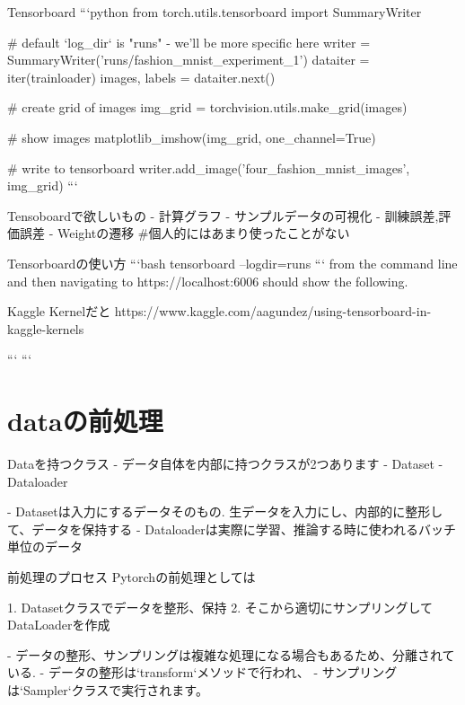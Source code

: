 \begin{frame}[fragile]{}Tensorboard
```python
from torch.utils.tensorboard import SummaryWriter

# default `log_dir` is "runs" - we'll be more specific here
writer = SummaryWriter('runs/fashion_mnist_experiment_1')
dataiter = iter(trainloader)
images, labels = dataiter.next()

# create grid of images
img_grid = torchvision.utils.make_grid(images)

# show images
matplotlib_imshow(img_grid, one_channel=True)

# write to tensorboard
writer.add_image('four_fashion_mnist_images', img_grid)
```

\end{frame}
\begin{frame}[fragile]{}Tensoboardで欲しいもの
- 計算グラフ
- サンプルデータの可視化
- 訓練誤差,評価誤差
- Weightの遷移 #個人的にはあまり使ったことがない

\end{frame}
\begin{frame}[fragile]{}Tensorboardの使い方
```bash
tensorboard --logdir=runs
```
from the command line and then navigating to https://localhost:6006 should show the following.

\end{frame}
\begin{frame}[fragile]{Kaggle Kernelだと}
https://www.kaggle.com/aagundez/using-tensorboard-in-kaggle-kernels

```
```


\section{dataの前処理}

\end{frame}
\begin{frame}[fragile]{}Dataを持つクラス
- データ自体を内部に持つクラスが2つあります
  - Dataset
  - Dataloader

- Datasetは入力にするデータそのもの.
  生データを入力にし、内部的に整形して、データを保持する
- Dataloaderは実際に学習、推論する時に使われるバッチ単位のデータ

\end{frame}
\begin{frame}[fragile]{}前処理のプロセス
Pytorchの前処理としては

1. Datasetクラスでデータを整形、保持
2. そこから適切にサンプリングしてDataLoaderを作成

- データの整形、サンプリングは複雑な処理になる場合もあるため、分離されている.
  - データの整形は`transform`メソッドで行われ、
  - サンプリングは`Sampler`クラスで実行されます。

\end{frame}
